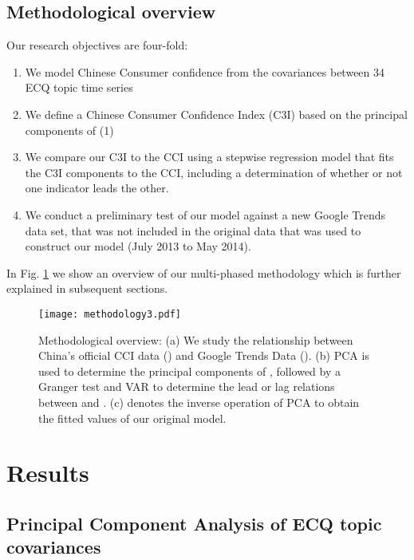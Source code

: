 \documentclass[10pt]{article}
\begin{document}
	\subsection*{Methodological overview}
	
	Our research objectives are four-fold:
	
	\begin{enumerate}
		\item We model Chinese Consumer confidence from the covariances between 34 ECQ topic time series
		\item We define a Chinese Consumer Confidence Index (C3I) based on the principal components of (1)
		\item We compare our C3I to the CCI using a stepwise regression model that fits the C3I components to the CCI,
		 	including a determination of whether or not one indicator leads the other.
		\item We conduct a preliminary test of our model against a new Google Trends data set, that was not included in the original
			data that was used to construct our model (July 2013 to May 2014).
	\end{enumerate}

In Fig. \ref{Methodology} we show an overview of our multi-phased methodology which is further explained in subsequent sections.

	\begin{figure}[h!]
	\begin{center}
	      \texttt{[image: methodology3.pdf]}
\caption{ \label{Methodology} Methodological overview: (a) We study the relationship between China's official CCI data () and Google Trends Data (). (b) PCA is used to determine the principal components of , followed by a Granger test and VAR to determine the lead or lag relations between  and . (c)  denotes the 
	inverse operation of PCA to obtain the fitted values of our original model. }
	\end{center}
	\end{figure}

\section*{Results}

	\subsection*{Principal Component Analysis of ECQ topic covariances}
\end{document}
